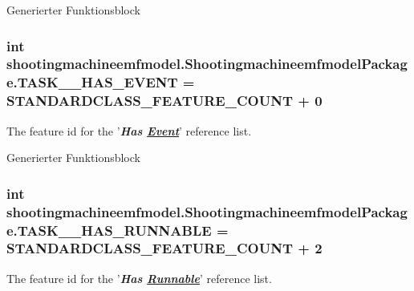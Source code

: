 Generierter Funktionsblock  \hypertarget{interfaceshootingmachineemfmodel_1_1_shootingmachineemfmodel_package_ab400549825734d82cb9b6835551aacc6}{
\subsubsection[{T\-A\-S\-K\-\_\-\-\_\-\-H\-A\-S\-\_\-\-E\-V\-E\-N\-T}]{\setlength{\rightskip}{0pt plus 5cm}int shootingmachineemfmodel.\-Shootingmachineemfmodel\-Package.\-T\-A\-S\-K\-\_\-\-\_\-\-H\-A\-S\-\_\-\-E\-V\-E\-N\-T = {\bf S\-T\-A\-N\-D\-A\-R\-D\-C\-L\-A\-S\-S\-\_\-\-F\-E\-A\-T\-U\-R\-E\-\_\-\-C\-O\-U\-N\-T} + 0}}\label{interfaceshootingmachineemfmodel_1_1_shootingmachineemfmodel_package_ab400549825734d82cb9b6835551aacc6}
The feature id for the '{\itshape {\bfseries Has \hyperlink{interfaceshootingmachineemfmodel_1_1_event}{Event}}}' reference list.

Generierter Funktionsblock  \hypertarget{interfaceshootingmachineemfmodel_1_1_shootingmachineemfmodel_package_a6dfa46683e73ddc332624916d8e636cf}{
\subsubsection[{T\-A\-S\-K\-\_\-\-\_\-\-H\-A\-S\-\_\-\-R\-U\-N\-N\-A\-B\-L\-E}]{\setlength{\rightskip}{0pt plus 5cm}int shootingmachineemfmodel.\-Shootingmachineemfmodel\-Package.\-T\-A\-S\-K\-\_\-\-\_\-\-H\-A\-S\-\_\-\-R\-U\-N\-N\-A\-B\-L\-E = {\bf S\-T\-A\-N\-D\-A\-R\-D\-C\-L\-A\-S\-S\-\_\-\-F\-E\-A\-T\-U\-R\-E\-\_\-\-C\-O\-U\-N\-T} + 2}}\label{interfaceshootingmachineemfmodel_1_1_shootingmachineemfmodel_package_a6dfa46683e73ddc332624916d8e636cf}
The feature id for the '{\itshape {\bfseries Has \hyperlink{interfaceshootingmachineemfmodel_1_1_runnable}{Runnable}}}' reference list.

